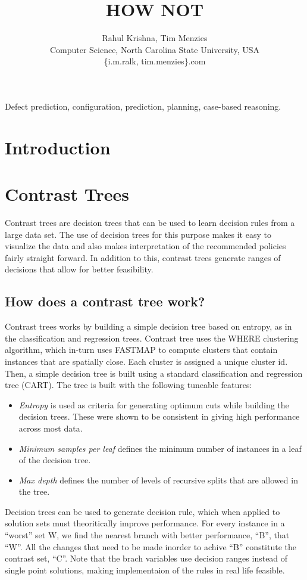 \documentclass[conference]{IEEEtran}
\title{HOW NOT}
\author{Rahul Krishna, Tim Menzies\\
        Computer Science, North Carolina State University, USA\\
       \{i.m.ralk, tim.menzies\}\@gmail.com
       
}
\begin{document}
  \maketitle
    \begin{abstract}
 
  \end{abstract}
  \begin{IEEEkeywords}
Defect prediction, configuration, prediction, planning, case-based reasoning.
  \end{IEEEkeywords}

\section{Introduction} 
\section{Contrast Trees}
Contrast trees are decision trees that can be used to learn decision rules from a large data set. The use of decision trees for this purpose makes it easy to visualize the data and also makes interpretation of the recommended policies fairly straight forward. In addition to this, contrast trees generate ranges of decisions that allow for better feasibility.
\subsection{How does a contrast tree work?}
Contrast trees works by building a simple decision tree based on entropy, as in the classification and regression trees. Contrast tree uses the WHERE clustering algorithm, which in-turn uses FASTMAP \cite{} to compute clusters 
that contain instances that are spatially close. Each cluster is assigned a unique cluster id. Then, a simple decision tree is built using a standard classification and regression tree (CART). The tree is built with the following tuneable features:
\begin{itemize}
\item \textit{Entropy} is used as criteria for generating optimum cuts while building the decision trees. These were shown to be consistent in giving high performance across most data.
\item \textit{Minimum samples per leaf} defines the minimum number of instances in a leaf of the decision tree.
\item \textit{Max depth} defines the number of levels of recursive splits that are allowed in the tree.
\end{itemize}
Decision trees can be used to generate decision rule, which when applied to solution sets must theoritically improve performance. For every instance in a ``worst'' set W, we find the nearest branch with better performance, ``B'', that ``W''. All the changes that need to be made inorder to achive ``B'' constitute the contrast set, ``C''. Note that the brach variables use decision ranges instead of single point solutions, making implementaion of the rules in real life feasible. 
\end{document}
